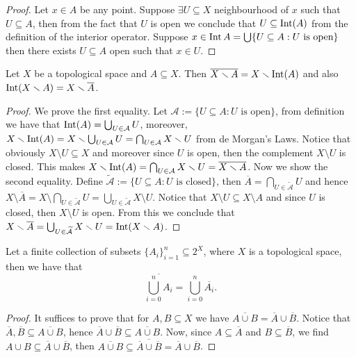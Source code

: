 \begin{proof}
Let \(x \in A\) be any point. Suppose \(\exists U \subseteq X\) neighbourhood
of \(x\) such that \(U \subseteq A\), then from the fact that \(U\) is open we
conclude that \(U \subseteq \operatorname{Int}(A)\) from the definition of the interior
operator. Suppose \(x \in \operatorname{Int} A = \bigcup \{U \subseteq A : U \text{ is
open}\}\) then there exists \(U \subseteq A\) open such that \(x \in U\).
\end{proof}

\begin{proposition}
Let \(X\) be a topological space and \(A \subseteq X\). Then \(\overline{X
\smallsetminus A} = X \smallsetminus \operatorname{Int}(A)\) and also \(\operatorname{Int}(X \smallsetminus A) =
X \smallsetminus \overline A\).
\end{proposition}

\begin{proof}
We prove the first equality. Let \(\mathcal A := \{U \subseteq A : U \text{ is
open}\}\), from definition we have that \(\operatorname{Int}(A) = \bigcup_{U \in \mathcal A} U\),
moreover, \(X \smallsetminus \operatorname{Int}(A) = X \smallsetminus \bigcup_{U \in \mathcal A} U = \bigcap_{U \in \mathcal A} X \smallsetminus U\)
from de Morgan's Laws. Notice that obviously \(X \setminus U \subseteq X\) and moreover since
\(U\) is open, then the complement \(X \setminus U\) is closed. This makes \(X \smallsetminus \operatorname{Int}(A)
= \bigcap_{U \in \mathcal A} X \smallsetminus U = \overline{X \smallsetminus A}\). Now we show the second
equality. Define \(\mathcal{\widetilde A} := \{U \subseteq A : U \text{ is closed}\}\),
then \(\overline A = \bigcap_{U \in \mathcal{\widetilde A}} U\) and hence \(X \setminus
\overline A = X \setminus \bigcap_{U \in \mathcal{\widetilde A}} U = \bigcup_{U \in \widetilde{\mathcal{A}}} X \setminus
U\). Notice that \(X\setminus U \subseteq X \setminus A\) and since \(U\) is closed, then \(X \setminus U\) is
open. From this we conclude that \(X \smallsetminus \overline A = \bigcup_{U \in \mathcal{\widetilde
A}} X \smallsetminus U = \operatorname{Int}(X \smallsetminus A)\).
\end{proof}

\begin{proposition}\label{prop: finite union of closures}
Let a finite collection of subsets \(\{A_i\}_{i = 1}^n \subseteq 2^X\), where
\(X\) is a topological space, then we have that
\[
  \overline{\bigcup_{i = 0}^n A_i} = \bigcup_{i = 0}^n \overline{A_i}.
\]
\end{proposition}

\begin{proof}
It suffices to prove that for \(A, B \subseteq X\) we have \(\overline{A \cup
B} = \overline A \cup \overline B\). Notice that \(\overline A,
\overline B \subseteq \overline{A \cup B}\), hence \(\overline A \cup
\overline B \subseteq \overline{A \cup B}\). Now, since \(A \subseteq
\overline A\) and \(B \subseteq \overline B\), we find \(A \cup B \subseteq
\overline A \cup \overline B\), then \(\overline{A \cup B} \subseteq
\overline{\overline A \cup \overline B} = \overline A \cup \overline B\).
\end{proof}

